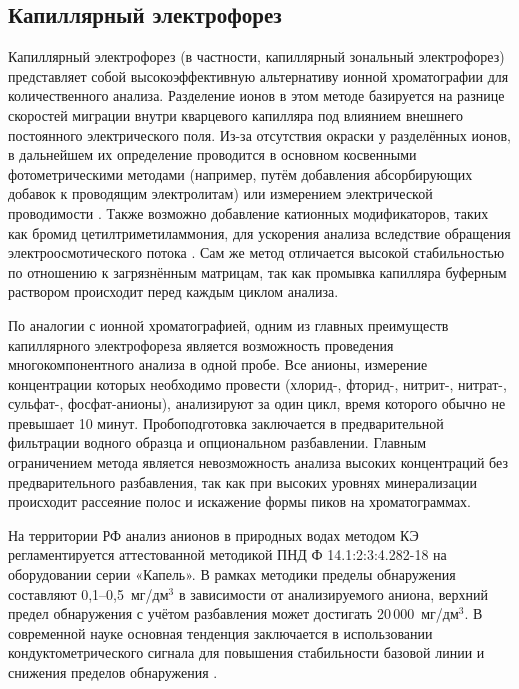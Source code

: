 \subsection{Капиллярный электрофорез}

Капиллярный электрофорез (в частности, капиллярный зональный электрофорез) представляет собой высокоэффективную альтернативу ионной хроматографии для количественного анализа. Разделение ионов в этом методе базируется на разнице скоростей миграции внутри кварцевого капилляра под влиянием внешнего постоянного электрического поля. Из-за отсутствия окраски у разделённых ионов, в дальнейшем их определение проводится в основном косвенными фотометрическими методами (например, путём добавления абсорбирующих добавок к проводящим электролитам) или измерением электрической проводимости \cite{pobozyApplicationCapillaryElectrophoresis2021b, hauserContactlessConductivityDetection2025, zhangAnalysisEnvironmentalPollutants2023}. Также возможно добавление катионных модификаторов, таких как бромид цетилтриметиламмония, для ускорения анализа вследствие обращения электроосмотического потока \cite{pobozyApplicationCapillaryElectrophoresis2021b}. Сам же метод отличается высокой стабильностью по отношению к загрязнённым матрицам, так как промывка капилляра буферным раствором происходит перед каждым циклом анализа.

По аналогии с ионной хроматографией, одним из главных преимуществ капиллярного электрофореза является возможность проведения многокомпонентного анализа в одной пробе. Все анионы, измерение концентрации которых необходимо провести (хлорид-, фторид-, нитрит-, нитрат-, сульфат-, фосфат-анионы), анализируют за один цикл, время которого обычно не превышает 10 минут. Пробоподготовка заключается в предварительной фильтрации водного образца и опциональном разбавлении. Главным ограничением метода является невозможность анализа высоких концентраций без предварительного разбавления, так как при высоких уровнях минерализации происходит рассеяние полос и искажение формы пиков на хроматограммах.

На территории РФ анализ анионов в природных водах методом КЭ регламентируется аттестованной методикой ПНД Ф 14.1:2:3:4.282-18 \cite{pndf14123428218} на оборудовании серии «Капель». В рамках методики пределы обнаружения составляют 0,1--0,5~мг/дм$^3$ в зависимости от анализируемого аниона, верхний предел обнаружения с учётом разбавления может достигать 20\,000~мг/дм$^3$. В современной науке основная тенденция заключается в использовании кондуктометрического сигнала для повышения стабильности базовой линии и снижения пределов обнаружения \cite{liPushingLimitsCapacitively2024}.

